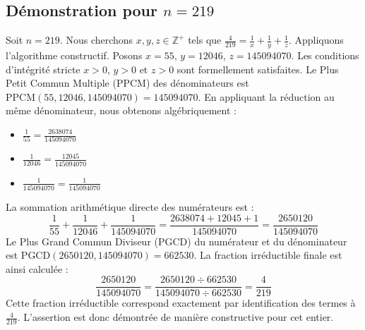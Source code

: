 \documentclass[11pt,a4paper]{article}
\begin{document}
\subsection{Démonstration pour $n = 219$}
Soit $n = 219$. Nous cherchons $x, y, z \in \mathbb{Z}^{+}$ tels que $\frac{4}{219} = \frac{1}{x} + \frac{1}{y} + \frac{1}{z}$.
Appliquons l'algorithme constructif. Posons $x = 55$, $y = 12046$, $z = 145094070$.
Les conditions d'intégrité stricte $x > 0$, $y > 0$ et $z > 0$ sont formellement satisfaites.
Le Plus Petit Commun Multiple (PPCM) des dénominateurs est $\text{PPCM}(55, 12046, 145094070) = 145094070$.
En appliquant la réduction au même dénominateur, nous obtenons algébriquement :
\begin{itemize}
    \item $\frac{1}{55} = \frac{2638074}{145094070}$
    \item $\frac{1}{12046} = \frac{12045}{145094070}$
    \item $\frac{1}{145094070} = \frac{1}{145094070}$
\end{itemize}
La sommation arithmétique directe des numérateurs est :
$$ \frac{1}{55} + \frac{1}{12046} + \frac{1}{145094070} = \frac{2638074 + 12045 + 1}{145094070} = \frac{2650120}{145094070} $$
Le Plus Grand Commun Diviseur (PGCD) du numérateur et du dénominateur est $\text{PGCD}(2650120, 145094070) = 662530$.
La fraction irréductible finale est ainsi calculée :
$$ \frac{2650120}{145094070} = \frac{2650120 \div 662530}{145094070 \div 662530} = \frac{4}{219} $$
Cette fraction irréductible correspond exactement par identification des termes à $\frac{4}{219}$. L'assertion est donc démontrée de manière constructive pour cet entier.
\end{document}
